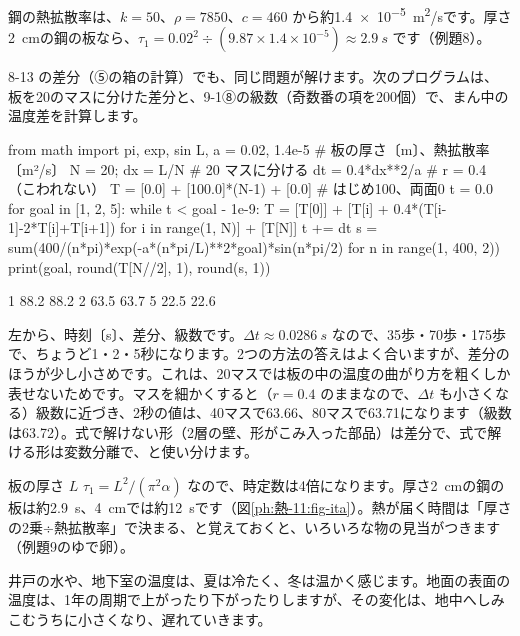 \noindent 鋼の熱拡散率は、$k=50$、$\rho=7850$、$c=460$ から約\qty{1.4e-5}{m^2/s}です。厚さ\qty{2}{cm}の鋼の板なら、$\tau_1=0.02^2\div(9.87\times1.4\times10^{-5})\approx\qty{2.9}{s}$ です（例題8）。

8-13 の差分（⑤の箱の計算）でも、同じ問題が解けます。次のプログラムは、板を20のマスに分けた差分と、9-1⑧の級数（奇数番の項を200個）で、まん中の温度差を計算します。
\begin{phcode}[Python]
from math import pi, exp, sin
L, a = 0.02, 1.4e-5      \# 板の厚さ〔m〕、熱拡散率〔m²/s〕
N = 20; dx = L/N         \# 20 マスに分ける
dt = 0.4*dx**2/a         \# r = 0.4（こわれない）
T = [0.0] + [100.0]*(N-1) + [0.0]   \# はじめ100、両面0
t = 0.0
for goal in [1, 2, 5]:
    while t < goal - 1e-9:
        T = [T[0]] + [T[i] + 0.4*(T[i-1]-2*T[i]+T[i+1])
                      for i in range(1, N)] + [T[N]]
        t += dt
    s = sum(400/(n*pi)*exp(-a*(n*pi/L)**2*goal)*sin(n*pi/2)
            for n in range(1, 400, 2))
    print(goal, round(T[N//2], 1), round(s, 1))
\end{phcode}
\begin{phcodeout}
1 88.2 88.2
2 63.5 63.7
5 22.5 22.6
\end{phcodeout}
左から、時刻〔s〕、差分、級数です。$\Delta t\approx\qty{0.0286}{s}$ なので、35歩・70歩・175歩で、ちょうど1・2・5秒になります。2つの方法の答えはよく合いますが、差分のほうが少し小さめです。これは、20マスでは板の中の温度の曲がり方を粗くしか表せないためです。マスを細かくすると（$r=0.4$ のままなので、$\Delta t$ も小さくなる）級数に近づき、2秒の値は、40マスで63.66、80マスで63.71になります（級数は63.72）。式で解けない形（2層の壁、形がこみ入った部品）は差分で、式で解ける形は変数分離で、と使い分けます。

\begin{phbaisuru}{板の厚さ $L$}
$\tau_1=L^2/(\pi^2\alpha)$ なので、時定数は4倍になります。厚さ\qty{2}{cm}の鋼の板は約\qty{2.9}{s}、\qty{4}{cm}では約\qty{12}{s}です（図\ref{ph:熱-11:fig-ita}）。熱が届く時間は「厚さの2乗÷熱拡散率」で決まる、と覚えておくと、いろいろな物の見当がつきます（例題9のゆで卵）。
\end{phbaisuru}

\label{ph:熱-11:sec10}
井戸の水や、地下室の温度は、夏は冷たく、冬は温かく感じます。地面の表面の温度は、1年の周期で上がったり下がったりしますが、その変化は、地中へしみこむうちに小さくなり、遅れていきます。

